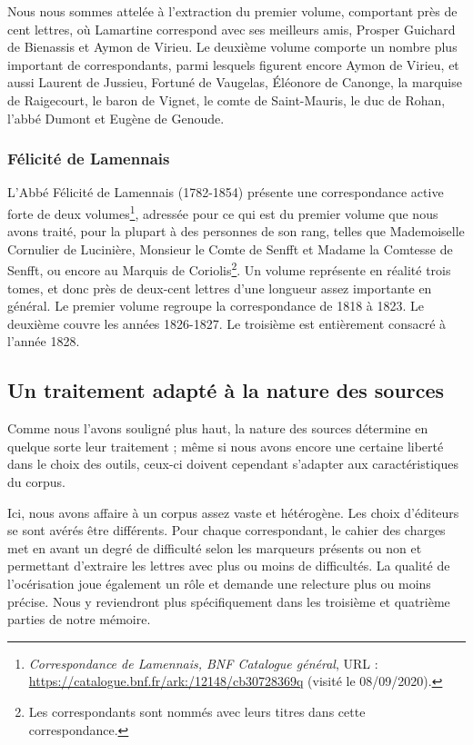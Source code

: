 Nous nous sommes attelée à l'extraction du premier volume, comportant près de cent lettres, où Lamartine correspond avec ses meilleurs amis, Prosper Guichard de Bienassis et Aymon de Virieu.
Le deuxième volume comporte un nombre plus important de correspondants, parmi lesquels figurent encore Aymon de Virieu, et aussi Laurent de Jussieu, Fortuné de Vaugelas, Éléonore de Canonge, la marquise de Raigecourt, le baron de Vignet, le comte de Saint-Mauris, le duc de Rohan, l'abbé Dumont et Eugène de Genoude.    

\subsubsection{Félicité de Lamennais}

L'Abbé Félicité de Lamennais (1782-1854) présente une correspondance active forte de deux volumes\footnote{\emph{ Correspondance de Lamennais, BNF Catalogue général}, URL : \url{https://catalogue.bnf.fr/ark:/12148/cb30728369q} (visité le 08/09/2020).}, adressée pour ce qui est du premier volume que nous avons traité, pour la plupart à des personnes de son rang, telles que Mademoiselle Cornulier de Lucinière, Monsieur le Comte de Senfft et Madame la Comtesse de Senfft, ou encore au Marquis de Coriolis\footnote{Les correspondants sont nommés avec leurs titres dans cette correspondance.}. Un volume représente en réalité trois tomes, et donc près de deux-cent lettres d'une longueur assez importante en général. Le premier volume regroupe la correspondance de 1818 à 1823. Le deuxième couvre les années 1826-1827. Le troisième est entièrement consacré à l’année 1828.

\subsection{Un traitement adapté à la nature des sources}

Comme nous l'avons souligné plus haut, la nature des sources détermine en quelque sorte leur traitement ; même si nous avons encore une certaine liberté dans le choix des outils, ceux-ci doivent cependant s'adapter aux caractéristiques du corpus.

Ici, nous avons affaire à un corpus assez vaste et hétérogène. Les choix d'éditeurs se sont avérés être différents. Pour chaque correspondant, le cahier des charges met en avant un degré de difficulté selon les marqueurs présents ou non et permettant d'extraire les lettres avec plus ou moins de difficultés. La qualité de l'océrisation joue également un rôle et demande une relecture plus ou moins précise. Nous y reviendront plus spécifiquement dans les troisième et quatrième parties de notre mémoire.\\

